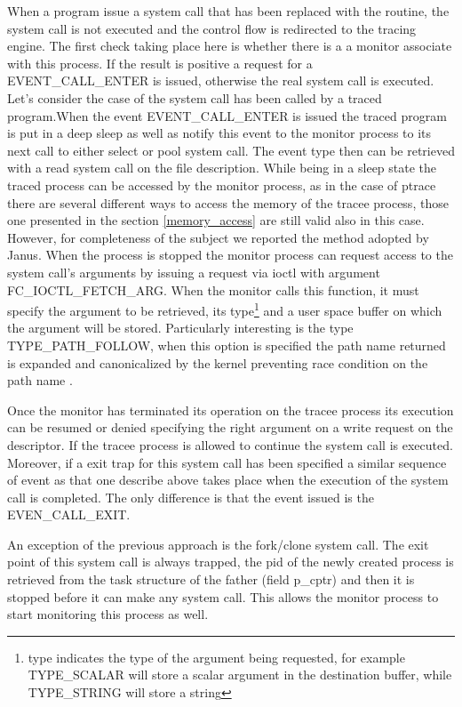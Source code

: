 When a program issue a system call that has been replaced with the routine, the system call is not executed and the control flow is redirected to the tracing engine. The first check taking place here is whether there is a a monitor associate with this process. If the result is positive a request for a EVENT\_CALL\_ENTER is issued, otherwise the real system call is executed. Let's consider the case of the system call has been called by a traced program.When the event EVENT\_CALL\_ENTER is issued the traced program is put in a deep sleep as well as notify this event to the monitor process to its next call to either select or pool system call.  The event type then can be retrieved with a read system call on the file description. 
While being in a sleep state the traced process can be accessed by the monitor process, as in the case of ptrace there are several different ways to access the memory of the tracee process, those one presented in the section \ref{memory_access} are still valid also in this case. However, for completeness of the subject we reported the method adopted by Janus. When the process is stopped the monitor process can request access to the system call's arguments by issuing a request via ioctl with argument FC\_IOCTL\_FETCH\_ARG. 
When the monitor calls this function, it must specify the argument to be retrieved, its type\footnote{ type indicates the type of the argument being requested, for example TYPE\_SCALAR will store a scalar argument in the destination buffer, while TYPE\_STRING will store a string} and a user space buffer on which the argument will be stored. Particularly interesting is the type TYPE\_PATH\_FOLLOW, when this option is specified the path name returned is expanded and canonicalized by the kernel preventing race condition on the path name \cite{race_condition}.

Once the monitor has terminated its operation on the tracee process its execution can be resumed or denied specifying the right argument on a write request on the descriptor. If the tracee process is allowed to continue the system call is executed. Moreover, if a exit trap for this system call has been specified a similar sequence of event as that one describe above takes place when the execution of the system call is completed. The only difference is that the event issued is the EVEN\_CALL\_EXIT.

An exception of the previous approach is the fork/clone system call. The exit point of this system call is always trapped, the pid of the newly created process is retrieved from the task structure of the father (field p\_cptr) and then it is stopped before it can make any system call. This allows the monitor process to start monitoring this process as well.   

